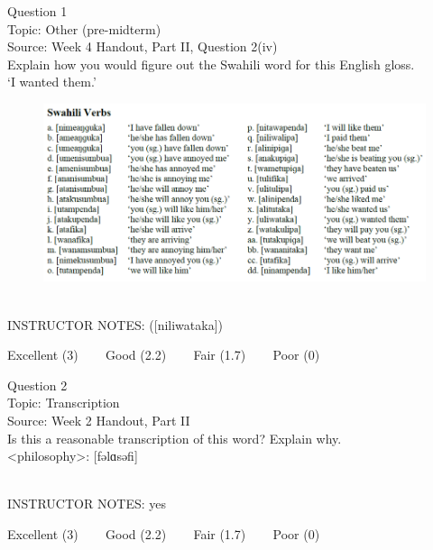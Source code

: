 \documentclass[12pt]{article}
\begin{document}
{\large Question 1}\\

Topic: Other (pre-midterm)\\
Source: Week 4 Handout, Part II, Question 2(iv)\\

Explain how you would figure out the Swahili word for this English gloss.\\

‘I wanted them.’

\begin{figure}[H]
\includegraphics{../images/swahiliverbs.png}
\end{figure}

~\\
INSTRUCTOR NOTES: ([niliwataka])


\vfill
Excellent (3) ~~~ Good (2.2) ~~~ Fair (1.7) ~~~ Poor (0)
\newpage

{\large Question 2}\\

Topic: Transcription\\
Source: Week 2 Handout, Part II\\

Is this a reasonable transcription of this word? Explain why.\\

<philosophy>: {[fəlɑsəfi]}


~\\
INSTRUCTOR NOTES: yes


\vfill
Excellent (3) ~~~ Good (2.2) ~~~ Fair (1.7) ~~~ Poor (0)
\newpage

\begin{center}
\textbf{{\color{red}{\HUGE END OF EXAM}}}\\

\end{center}
\newpage

\begin{center}
\textbf{{\color{blue}{\HUGE START OF EXAM\\}}}

\textbf{{\color{blue}{\HUGE Student ID: 89930\\}}}

\textbf{{\color{blue}{\HUGE 9:40\\}}}

\end{center}
\newpage
\end{document}
